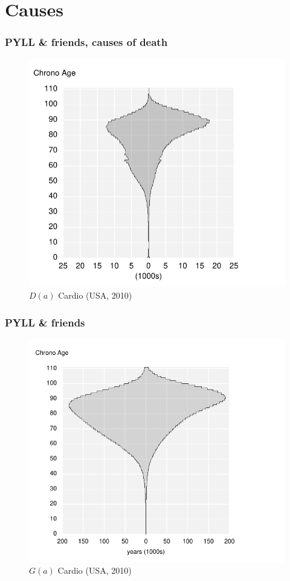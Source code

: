 \documentclass{beamer}
\begin{document}
\section{Causes}
\begin{frame}
\frametitle{PYLL \& friends, causes of death}
\vspace{-1cm}
\begin{figure}[b]
    \centering
    \includegraphics[scale=.7]{Figures/f7_Dac.pdf}
    \caption{$D(a)$ Cardio (USA, 2010)}
\end{figure} 
\end{frame}

\begin{frame}
\frametitle{PYLL \& friends}
\vspace{-1cm}
\begin{figure}[b]
    \centering
    \includegraphics[scale=.7]{Figures/f8_AgesWonc.pdf}
    \caption{$G(a)$ Cardio (USA, 2010)}
\end{figure} 
\end{frame}
\end{document}
